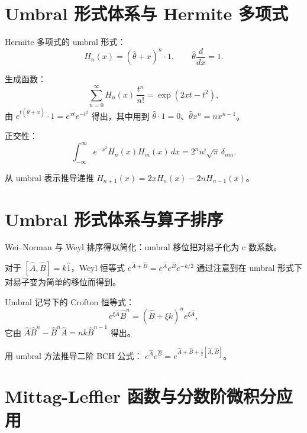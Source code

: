 \section{Umbral 形式体系与 Hermite 多项式}

Hermite 多项式的 umbral 形式：
\begin{equation}
H_n(x) = (\hat\theta+x)^n\cdot 1,
\qquad \hat\theta\frac{d}{dx}=1.
\label{eq:9.5.1}
\end{equation}

生成函数：
\begin{equation}
\sum_{n=0}^\infty H_n(x)\,\frac{t^n}{n!}
= \exp(2xt-t^2),
\label{eq:9.5.2}
\end{equation}
由 $e^{t(\hat\theta+x)}\cdot1=e^{xt}e^{-t^2}$ 得出，其中用到 $\hat\theta\cdot1=0$、$\hat\theta x^n=nx^{n-1}$。

正交性：
\begin{equation}
\int_{-\infty}^{\infty} e^{-x^2}H_n(x)H_m(x)\,dx
= 2^n n!\sqrt{\pi}\,\delta_{nm}.
\label{eq:9.5.3}
\end{equation}

\begin{exercise}
从 umbral 表示推导递推 $H_{n+1}(x)=2xH_n(x)-2nH_{n-1}(x)$。
\end{exercise}

\section{Umbral 形式体系与算子排序}

Wei--Norman 与 Weyl 排序得以简化：umbral 移位把对易子化为 c 数系数。

对于 $[\hat A,\hat B]=k\hat 1$，Weyl 恒等式
$e^{\hat A+\hat B}=e^{\hat A}e^{\hat B}e^{-k/2}$
通过注意到在 umbral 形式下对易子变为简单的移位而得到。

Umbral 记号下的 Crofton 恒等式：
\begin{equation}
e^{\xi\hat A}\hat B^n = (\hat B+\xi k)^n e^{\xi\hat A},
\label{eq:9.6.1}
\end{equation}
它由 $\hat A\hat B^n - \hat B^n\hat A = nk\hat B^{n-1}$ 得出。

\begin{exercise}
用 umbral 方法推导二阶 BCH 公式：
$e^{\hat A}e^{\hat B}=e^{\hat A+\hat B+\frac12[\hat A,\hat B]}$。
\end{exercise}

\section{Mittag-Leffler 函数与分数阶微积分应用}

